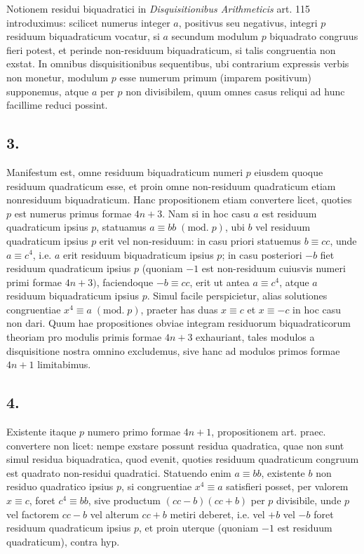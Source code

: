 \documentclass[twoside,12pt]{memoir}
\renewcommand{\pmod}[1]{\;(\textrm{mod.}\;#1)}
\begin{document}
Notionem residui biquadratici in \textit{Disquisitionibus Arithmeticis} art. 115 introduximus: scilicet numerus integer \(a\), positivus seu negativus, integri \(p\) residuum biquadraticum vocatur, si \(a\) secundum modulum \(p\) biquadrato congruus fieri potest, et perinde non-residuum biquadraticum, si talis congruentia non exstat. In omnibus disquisitionibus sequentibus, ubi contrarium expressis verbis non monetur, modulum \(p\) esse numerum primum (imparem positivum) supponemus, atque \(a\) per \(p\) non divisibilem, quum omnes casus reliqui ad hunc facillime reduci possint.

\subsection*{3.}
 
Manifestum est, omne residuum biquadraticum numeri \(p\) eiusdem quoque residuum quadraticum esse, et proin omne non-residuum quadraticum etiam nonresiduum biquadraticum. Hanc propositionem etiam convertere licet, quoties \(p\) est numerus primus formae \(4 n+3\). Nam si in hoc casu \(a\) est residuum quadraticum ipsius \(p\), statuamus \(a \equiv b b \pmod{p}\), ubi \(b\) vel residuum quadraticum ipsius \(p\) erit vel non-residuum: in casu priori statuemus \(b \equiv c c\), unde \(a \equiv c^{4}\), i.e. \(a\) erit residuum biquadraticum ipsius \(p\); in casu posteriori \(-b\) fiet residuum quadraticum ipsius \(p\) (quoniam \(-1\) est non-residuum cuiusvis numeri primi formae \(4 n+3)\), faciendoque \(-b \equiv c c\), erit ut antea \(a \equiv c^{4}\), atque \(a\) residuum biquadraticum ipsius \(p\). Simul facile perspicietur, alias solutiones congruentiae \(x^{4} \equiv a\pmod{p}\), praeter has duas \(x \equiv c\) et \(x \equiv-c\) in hoc casu non dari. Quum hae propositiones obviae integram residuorum biquadraticorum theoriam pro modulis primis formae \(4 n+3\) exhauriant, tales modulos a disquisitione nostra omnino excludemus, sive hanc ad modulos primos formae \(4 n+1\) limitabimus.

\subsection*{4.}
 
Existente itaque \(p\) numero primo formae \(4 n+1\), propositionem art. praec. convertere non licet: nempe exstare possunt residua quadratica, quae non sunt simul residua biquadratica, quod evenit, quoties residuum quadraticum congruum est quadrato non-residui quadratici. Statuendo enim \(a \equiv b b\), existente \(b\) non\pagebreak%
residuo quadratico ipsius \(p\), si congruentiae \(x^{4} \equiv a\) satisfieri posset, per valorem \(x \equiv c\), foret \(c^{4} \equiv b b\), sive productum \((c c-b)(c c+b)\) per \(p\) divisibile, unde \(p\) vel factorem \(c c-b\) vel alterum \(c c+b\) metiri deberet, i.e. vel \(+b\) vel \(-b\) foret residuum quadraticum ipsius \(p\), et proin uterque (quoniam \(-1\) est residuum quadraticum), contra hyp.
 
\end{document}
